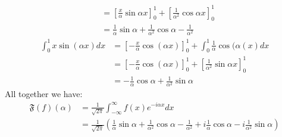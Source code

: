 \documentclass[11pt]{article}
\begin{document}
\begin{solution}
\begin{align*}
        \\ & 
        =\left[\frac{x}{\alpha} \sin \alpha x\right]_0^1+\left[\frac{1}{\alpha^2} \cos \alpha x\right]_0^1 
        \\ & 
        =\frac{1}{\alpha} \sin \alpha+\frac{1}{\alpha^2} \cos \alpha-\frac{1}{\alpha^2}
    \end{align*}
    \begin{align*} 
        \int_0^1 x \sin (\alpha x) d x 
        & 
        =\left[-\frac{x}{\alpha} \cos (\alpha x)\right]_0^1+\int_0^1 \frac{1}{\alpha} \cos (\alpha(x) d x 
        \\ & 
        =\left[-\frac{x}{\alpha} \cos (\alpha x)\right]_0^1+\left[\frac{1}{\alpha^2} \sin \alpha x\right]_0^1 
        \\ & 
        =-\frac{1}{\alpha} \cos \alpha+\frac{1}{\alpha^2} \sin \alpha
    \end{align*}
    All together we have:
    \begin{align*}
        \mathfrak{F}(f)(\alpha)
        &
        =
        \frac{1}{\sqrt{2 \pi}} \int_{-\infty}^{\infty} f(x) e^{-i \alpha x} d x 
        \\&
        = 
        \frac{1}{\sqrt{2\pi}}\left(\frac{1}{\alpha} \sin \alpha+\frac{1}{\alpha^2} \cos \alpha-\frac{1}{\alpha^2} +i\frac{1}{\alpha} \cos \alpha-i\frac{1}{\alpha^2} \sin \alpha\right)
    \end{align*}
\end{solution}
\end{document}
